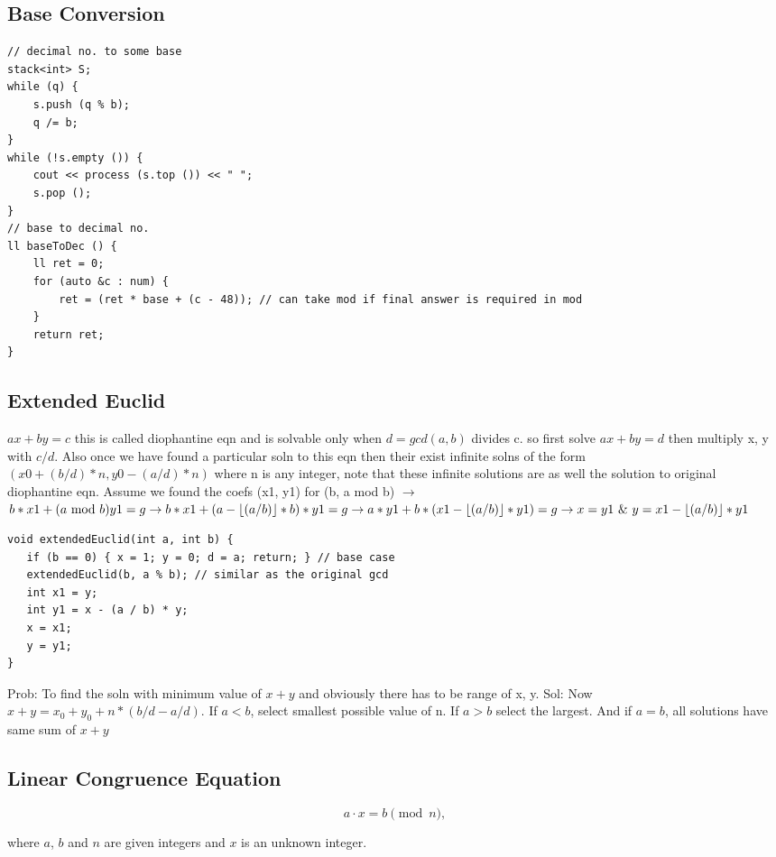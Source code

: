 \documentclass[8pt, a4paper, oneside, twocolumn]{extarticle}
\begin{document}
\subsection{Base Conversion}
\begin{verbatim}
// decimal no. to some base
stack<int> S;
while (q) {
    s.push (q % b);
    q /= b;
}
while (!s.empty ()) {
    cout << process (s.top ()) << " ";
    s.pop ();
}
// base to decimal no.
ll baseToDec () {
    ll ret = 0;
    for (auto &c : num) {
        ret = (ret * base + (c - 48)); // can take mod if final answer is required in mod
    }
    return ret;
}
\end{verbatim}
\subsection{Extended Euclid}
$ax + by = c$ this is called diophantine eqn and is solvable only when $d = gcd(a, b)$ divides c. so first solve $ax + by = d$ then multiply x, y with $c / d$. Also once we have found a particular soln to this eqn then their exist infinite solns of the form $(x0 + (b/d)*n, y0 - (a/d)*n)$ where n is any integer, note that these infinite solutions are as well the solution to original diophantine eqn. Assume we found the coefs (x1, y1) for (b, a mod b) $\rightarrow$ $b*x1 + (a\text{ mod }b)y1 = g\\ \rightarrow b*x1 + (a - \lfloor(a/b)\rfloor*b)*y1=g\\
\rightarrow a*y1 + b*(x1 - \lfloor (a/b)\rfloor * y1) = g\\
\rightarrow x = y1\text{ \& }y = x1 - \lfloor (a/b)\rfloor*y1$
\begin{verbatim}
void extendedEuclid(int a, int b) {
   if (b == 0) { x = 1; y = 0; d = a; return; } // base case
   extendedEuclid(b, a % b); // similar as the original gcd
   int x1 = y;
   int y1 = x - (a / b) * y;
   x = x1;
   y = y1;
}
\end{verbatim}
Prob: To find the soln with minimum value of $x + y$ and obviously there has to be range of x, y. Sol: Now $x + y = x_0 + y_0 + n * (b/d - a/d)$. If $a < b$, select smallest possible value of n. If $a > b$ select the largest. And if $a = b$, all solutions have same sum of $x + y$
\subsection{Linear Congruence Equation}
$$a \cdot x = b \pmod n,$$

where $a$, $b$ and $n$ are given integers and $x$ is an unknown integer.
\end{document}
